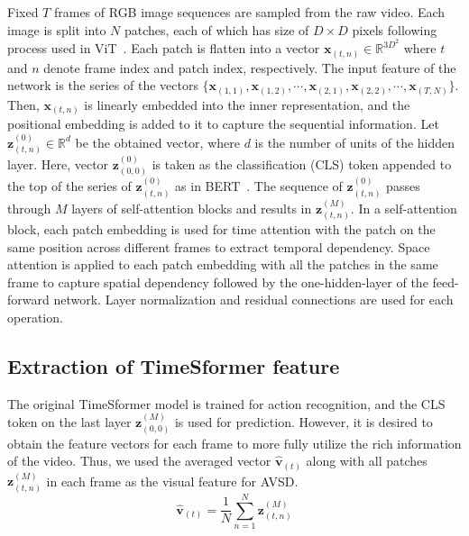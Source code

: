 \documentclass[letterpaper]{article} %
\begin{document}
Fixed $T$ frames of RGB image sequences are sampled from the raw video.
Each image is split into $N$ patches, each of which has size of $D \times D$ pixels following process used in ViT~\cite{Dosovitskiy2020image}.
Each patch is flatten into a vector $\bm{x}_{(t,n)} \in \mathbb{R}^{3D^{2}}$ where $t$ and $n$ denote frame index and patch index, respectively.
The input feature of the network is the series of the vectors $\{\bm{x}_{(1,1)}, \bm{x}_{(1,2)}, \cdots, \bm{x}_{(2,1)}, \bm{x}_{(2,2)}, \cdots, \bm{x}_{(T,N)}\}$.
Then, $\bm{x}_{(t,n)}$ is linearly embedded into the inner representation, and the positional embedding is added to it to capture the sequential information.
Let $\bm{z}^{(0)}_{(t,n)} \in \mathbb{R}^{d}$ be the obtained vector, where $d$ is the number of units of the hidden layer.
Here, vector $\bm{z}^{(0)}_{(0,0)}$ is taken as the classification (CLS) token appended to the top of the series of $\bm{z}^{(0)}_{(t,n)}$ as in BERT~\cite{Devlin2018bert}.
The sequence of $\bm{z}^{(0)}_{(t,n)}$ passes through $M$ layers of self-attention blocks and results in $\bm{z}^{(M)}_{(t,n)}$.
In a self-attention block, each patch embedding is used for time attention with the patch on the same position across different frames to extract temporal dependency.
Space attention is applied to each patch embedding with all the patches in the same frame to capture spatial dependency followed by the one-hidden-layer of the feed-forward network.
Layer normalization and residual connections are used for each operation.

\subsection{Extraction of TimeSformer feature}
The original TimeSformer model is trained for action recognition, and the CLS token on the last layer $\bm{z}^{(M)}_{(0,0)}$ is used for prediction.
%
However, it is desired to obtain the feature vectors for each frame to more fully utilize the rich information of the video.
Thus, we used the averaged vector $\bm{\hat{v}}_{(t)}$ along with all patches $\bm{z}^{(M)}_{(t,n)}$ in each frame as the visual feature for AVSD.
\begin{equation}
  \bm{\hat{v}}_{(t)} = \frac{1}{N}\sum_{n=1}^{N}\bm{z}^{(M)}_{(t,n)}
\end{equation}
\end{document}
